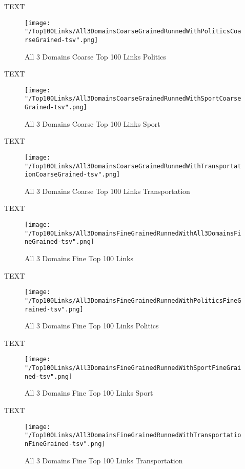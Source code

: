 \documentclass[thesis=M,english]{FITthesis}[2018/05/30]
\begin{document}
	TEXT

	\begin{figure}\centering
		\texttt{[image: "/Top100Links/All3DomainsCoarseGrainedRunnedWithPoliticsCoarseGrained-tsv".png]}
		\caption{All 3 Domains Coarse Top 100 Links Politics}\label{}
	\end{figure}	

	TEXT	

	\begin{figure}\centering
		\texttt{[image: "/Top100Links/All3DomainsCoarseGrainedRunnedWithSportCoarseGrained-tsv".png]}
		\caption{All 3 Domains Coarse Top 100 Links Sport}\label{}
	\end{figure}
	
		TEXT	

	\begin{figure}\centering
		\texttt{[image: "/Top100Links/All3DomainsCoarseGrainedRunnedWithTransportationCoarseGrained-tsv".png]}
		\caption{All 3 Domains Coarse Top 100 Links Transportation}\label{}	
	\end{figure}
		
		TEXT	

	\begin{figure}\centering
		\texttt{[image: "/Top100Links/All3DomainsFineGrainedRunnedWithAll3DomainsFineGrained-tsv".png]}
		\caption{All 3 Domains Fine Top 100 Links }\label{}	
	\end{figure}
	
	TEXT

	\begin{figure}\centering
		\texttt{[image: "/Top100Links/All3DomainsFineGrainedRunnedWithPoliticsFineGrained-tsv".png]}
		\caption{All 3 Domains Fine Top 100 Links Politics}\label{}
	\end{figure}	

	TEXT	

	\begin{figure}\centering
		\texttt{[image: "/Top100Links/All3DomainsFineGrainedRunnedWithSportFineGrained-tsv".png]}
		\caption{All 3 Domains Fine Top 100 Links Sport}\label{}
	\end{figure}
	
		TEXT	

	\begin{figure}\centering
		\texttt{[image: "/Top100Links/All3DomainsFineGrainedRunnedWithTransportationFineGrained-tsv".png]}
		\caption{All 3 Domains Fine Top 100 Links Transportation}\label{}	
	\end{figure}
	
\end{document}
